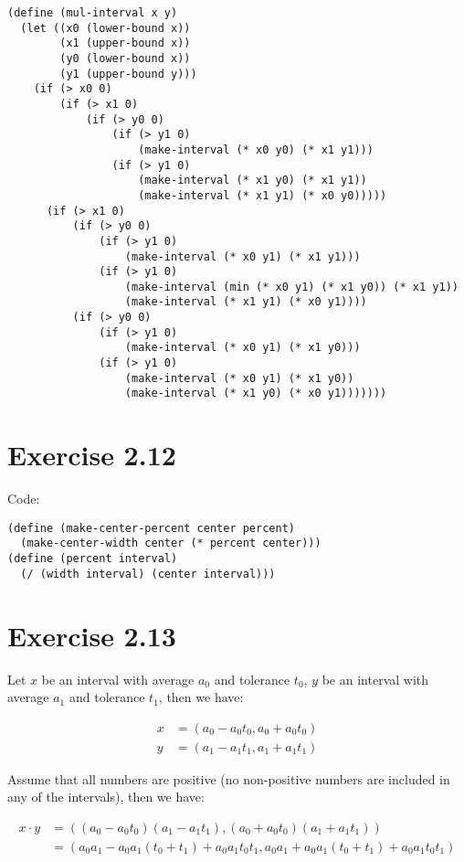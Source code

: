 \documentclass[../main.tex]{subfiles}
\begin{document}
\begin{lstlisting}
(define (mul-interval x y)
  (let ((x0 (lower-bound x))
        (x1 (upper-bound x))
        (y0 (lower-bound x))
        (y1 (upper-bound y)))
    (if (> x0 0)
        (if (> x1 0)
            (if (> y0 0)
                (if (> y1 0)
                    (make-interval (* x0 y0) (* x1 y1)))
                (if (> y1 0)
                    (make-interval (* x1 y0) (* x1 y1))
                    (make-interval (* x1 y1) (* x0 y0)))))
      (if (> x1 0)
          (if (> y0 0)
              (if (> y1 0)
                  (make-interval (* x0 y1) (* x1 y1)))
              (if (> y1 0)
                  (make-interval (min (* x0 y1) (* x1 y0)) (* x1 y1))
                  (make-interval (* x1 y1) (* x0 y1))))
          (if (> y0 0)
              (if (> y1 0)
                  (make-interval (* x0 y1) (* x1 y0)))
              (if (> y1 0)
                  (make-interval (* x0 y1) (* x1 y0))
                  (make-interval (* x1 y0) (* x0 y1)))))))
\end{lstlisting}

\section{Exercise 2.12}

Code:

\begin{lstlisting}
(define (make-center-percent center percent)
  (make-center-width center (* percent center)))
(define (percent interval)
  (/ (width interval) (center interval)))
\end{lstlisting}

\section{Exercise 2.13}

Let $x$ be an interval with average $a_0$ and tolerance $t_0$,
 $y$ be an interval with average $a_1$ and tolerance $t_1$, then we have:

\begin{align*}
x &= (a_0 - a_0 t_0, a_0 + a_0 t_0) \\
y &= (a_1 - a_1 t_1, a_1 + a_1 t_1)
\end{align*}

Assume that all numbers are positive (no non-positive numbers
 are included in any of the intervals), then we have:

\begin{align*}
x \cdot y &= ((a_0 - a_0 t_0)(a_1 - a_1 t_1), (a_0 + a_0 t_0)(a_1 + a_1 t_1)) \\
&= (a_0 a_1 - a_0 a_1 (t_0 + t_1) + a_0 a_1 t_0 t_1, a_0 a_1 + a_0 a_1 (t_0 + t_1) + a_0 a_1 t_0 t_1)
\end{align*}
\end{document}
